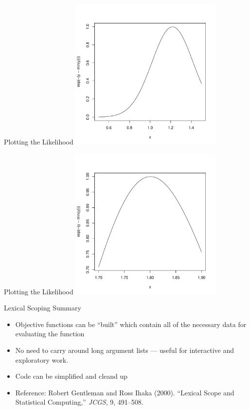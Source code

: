 \documentclass[aspectratio=169]{beamer}
\begin{document}
\begin{frame}{Plotting the Likelihood}
\includegraphics[width=3in,height=3in]{mulike}
\end{frame}

\begin{frame}{Plotting the Likelihood}
\includegraphics[width=3in,height=3in]{sigmalike}
\end{frame}


\begin{frame}{Lexical Scoping Summary}
\begin{itemize}
\item
Objective functions can be ``built'' which contain all of the
necessary data for evaluating the function
\item
No need to carry around long argument lists --- useful for interactive
and exploratory work.
\item
Code can be simplified and cleand up
\item
Reference: Robert Gentleman and Ross Ihaka (2000). ``Lexical Scope and
Statistical Computing,'' \textit{JCGS}, 9, 491--508.
\end{itemize}
\end{frame}
\end{document}
